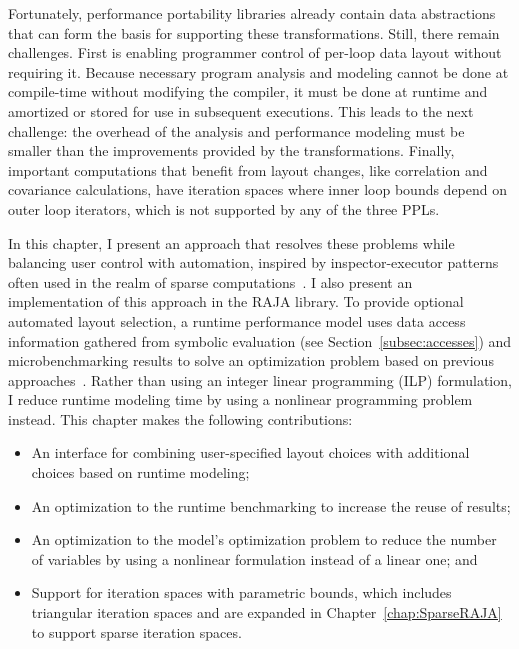 Fortunately, performance portability libraries already contain data abstractions that can form the basis for supporting these transformations.
Still, there remain challenges.
First is enabling programmer control of per-loop data layout without requiring it.
Because necessary program analysis and modeling cannot be done at compile-time without modifying the compiler, it must be done at runtime and amortized or stored for use in subsequent executions.
This leads to the next challenge: the overhead of the analysis and performance modeling must be smaller than the improvements provided by the transformations.
Finally, important computations that benefit from layout changes, like correlation and covariance calculations, have iteration spaces where inner loop bounds depend on outer loop iterators, which is not supported by any of the three PPLs.  %

In this chapter, I present an approach that resolves these problems while balancing user control with automation, inspired by inspector-executor patterns often used in the realm of sparse computations~\cite{saltz1990run,saltz1991multiprocessors,Strout14IPDPS,strout2018sparse}.
I also present an implementation of this approach in the RAJA library.
To provide optional automated layout selection, a runtime performance model uses data access information gathered from symbolic evaluation (see Section~\ref{subsec:accesses}) and microbenchmarking results to solve an optimization problem based on previous approaches~\cite{bixby1994automatic}.
Rather than using an integer linear programming (ILP) formulation, I reduce runtime modeling time by using a nonlinear programming problem instead. 
This chapter makes the following contributions:
\begin{itemize}
\item An interface for combining user-specified layout choices with additional choices based on runtime modeling;
\item An optimization to the runtime benchmarking to increase the reuse of results;
\item An optimization to the model's optimization problem to reduce the number of variables by using a nonlinear formulation instead of a linear one; and 
\item Support for iteration spaces with parametric bounds, which includes triangular iteration spaces and are expanded in Chapter~\ref{chap:SparseRAJA} to support sparse iteration spaces. %
\end{itemize}

